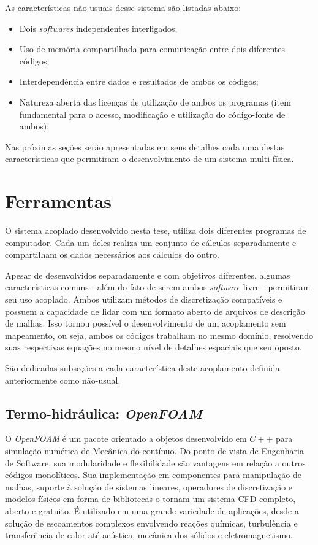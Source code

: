 As características não-usuais desse sistema são listadas abaixo:

\begin{itemize}
\item Dois \textit{softwares} independentes interligados;
\item Uso de memória compartilhada para comunicação entre dois diferentes códigos;
\item Interdependência entre dados e resultados de ambos os códigos;
\item Natureza aberta das licenças de utilização de ambos os programas (item fundamental para
  o acesso, modificação e utilização do código-fonte de ambos);
\end{itemize}

Nas próximas seções serão apresentadas em seus detalhes cada uma destas características que
permitiram o desenvolvimento de um sistema multi-física.

\section{Ferramentas}
\label{sec:ferr}

O sistema acoplado desenvolvido nesta tese, utiliza dois diferentes programas de computador. Cada um deles
realiza um conjunto de cálculos separadamente e compartilham os dados necessários aos cálculos do outro.

Apesar de desenvolvidos separadamente e com objetivos diferentes, algumas características comuns - além
do fato de serem ambos \textit{software} livre - permitiram seu uso acoplado. Ambos utilizam métodos de
discretização compatíveis e possuem a capacidade de lidar com um formato aberto de arquivos de descrição
de malhas. Isso tornou possível o desenvolvimento de um acoplamento sem mapeamento, ou seja, ambos os
códigos trabalham no mesmo domínio, resolvendo suas respectivas equações no mesmo nível de detalhes
espaciais que seu oposto.

São dedicadas subseções a cada característica deste acoplamento definida anteriormente como não-usual.

\subsection{Termo-hidráulica: \textit{OpenFOAM}}
\label{subsection:openfoam}

O \textit{OpenFOAM} é um pacote orientado a objetos desenvolvido em $C++$ para simulação numérica de Mecânica
do contínuo. Do ponto de vista de Engenharia de Software, sua modularidade e flexibilidade são vantagens
em relação a outros códigos monolíticos. Sua implementação em componentes para manipulação de malhas, suporte
à solução de sistemas lineares, operadores de discretização e modelos físicos em forma de bibliotecas o tornam
um sistema CFD completo, aberto e gratuito. É utilizado em uma grande variedade
de aplicações, desde a solução de escoamentos complexos envolvendo reações químicas, turbulência e
transferência de calor até acústica, mecânica dos sólidos e eletromagnetismo. 

